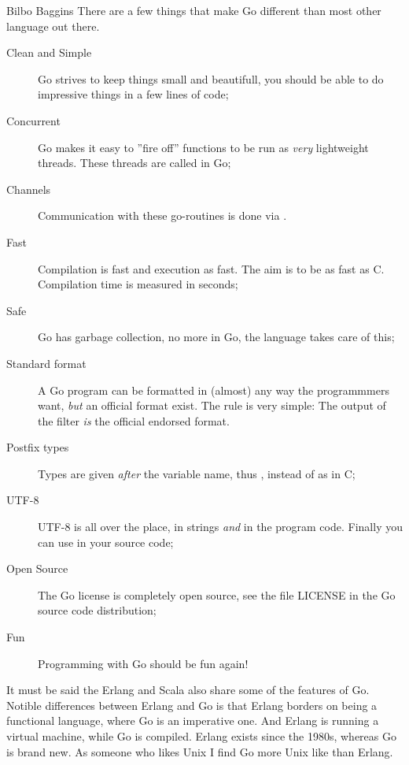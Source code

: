 {Bilbo Baggins}\noindent
There are a few things that make Go different than most other language
out there.
\begin{description}
\item[Clean and Simple]
Go strives to keep things small and beautifull, you should
be able to do impressive things in a few lines of code;
\item[Concurrent]
Go makes it easy to ''fire off'' functions to be
run as \emph{very} lightweight threads. These threads are called
 in Go;

\item[Channels] 
Communication with these go-routines is done
via  \cite{csp}.

\item[Fast]
Compilation is fast and execution as fast. The aim is
to be as fast as C. Compilation time is measured in seconds;

\item[Safe]
Go has garbage collection, no more  in Go,
the language takes care of this;

\item[Standard format]
A Go program can be formatted in (almost) any way the programmmers want,
\emph{but} an official format exist. The rule is very simple:
The output of the filter  \emph{is} the official endorsed
format.

\item[Postfix types]
Types are given \emph{after} the variable name, thus ,
instead of  as in C;

\item[UTF-8]
UTF-8 is all over the place, in strings
\emph{and} in the program code. Finally you can use  in your source code;

\item[Open Source]
The Go license is completely open source, see the file LICENSE in the Go
source code distribution;

\item[Fun]
Programming with Go should be fun again!

\end{description}
It must be said the Erlang\cite{erlang} and Scala\cite{scala} also share some
\draft{}%
of the features of Go. Notible differences between Erlang
and Go is that Erlang borders on being a functional language,
where Go is an imperative one. And Erlang is running a virtual
machine, while Go is compiled. Erlang exists since the 1980s, whereas
Go is brand new. As someone who likes Unix I find Go more Unix like
than Erlang.

